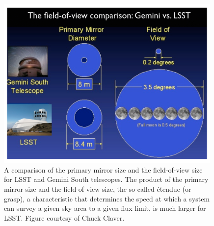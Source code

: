 \documentclass{iau}
\begin{document}
\begin{figure}[t!]
\begin{center}
\includegraphics[width=0.99\textwidth, angle=0]{LSSTvsGemini.pdf} 
\caption{
A comparison of the primary mirror size and the field-of-view size for LSST 
and Gemini South telescopes. The product of the primary mirror size and 
the field-of-view size, the so-called \'etendue (or grasp), a characteristic 
that determines the speed at which a system can survey a given sky area 
to a given flux limit, is much larger for LSST. Figure courtesy of Chuck Claver.}
\label{fig:Gemini}
\end{center}
\end{figure}
\end{document}
